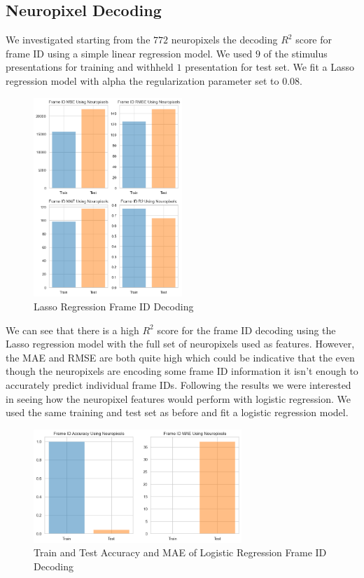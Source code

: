 \documentclass[12pt, letterpaper]{article}
\begin{document}
\subsection{Neuropixel Decoding}
\label{subsec:neuropixel_decoding}
We investigated starting from the $772$ neuropixels the decoding $R^2$ score for frame ID using a simple linear regression model. We used $9$ of the stimulus presentations for training and withheld $1$ presentation for test set. We fit a Lasso regression model with alpha the regularization parameter set to $0.08$. 
\begin{figure}[H]
    \centering
    \includegraphics[width=0.5\textwidth]{frame_id_metrics_lasso_.08.png}
    \caption{Lasso Regression Frame ID Decoding}
    \label{fig:lasso_frame_id}
\end{figure}
We can see that there is a high $R^2$ score for the frame ID decoding using the Lasso regression model with the full set of neuropixels used as features. However, the MAE and RMSE are both quite high which could be indicative that the even though the neuropixels are encoding some frame ID information it isn't enough to accurately predict individual frame IDs. Following the results we were interested in seeing how the neuropixel features would perform with logistic regression. We used the same training and test set as before and fit a logistic regression model.

\begin{figure}[H]
    \centering
    \includegraphics[width=0.7\textwidth]{frame_id_metrics_logistic.png}
    \caption{Train and Test Accuracy and MAE of Logistic Regression Frame ID Decoding}
    \label{fig:neuropixel_logistic_frame_id}
\end{figure}
\end{document}
